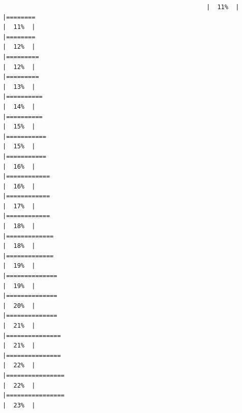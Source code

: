 \documentclass[
]{article}
\begin{document}
\begin{verbatim}
                                                        |  11%  |                                                                              |========                                                              |  11%  |                                                                              |========                                                              |  12%  |                                                                              |=========                                                             |  12%  |                                                                              |=========                                                             |  13%  |                                                                              |==========                                                            |  14%  |                                                                              |==========                                                            |  15%  |                                                                              |===========                                                           |  15%  |                                                                              |===========                                                           |  16%  |                                                                              |============                                                          |  16%  |                                                                              |============                                                          |  17%  |                                                                              |============                                                          |  18%  |                                                                              |=============                                                         |  18%  |                                                                              |=============                                                         |  19%  |                                                                              |==============                                                        |  19%  |                                                                              |==============                                                        |  20%  |                                                                              |==============                                                        |  21%  |                                                                              |===============                                                       |  21%  |                                                                              |===============                                                       |  22%  |                                                                              |================                                                      |  22%  |                                                                              |================                                                      |  23%  |                                                                              
\end{verbatim}
\end{document}
